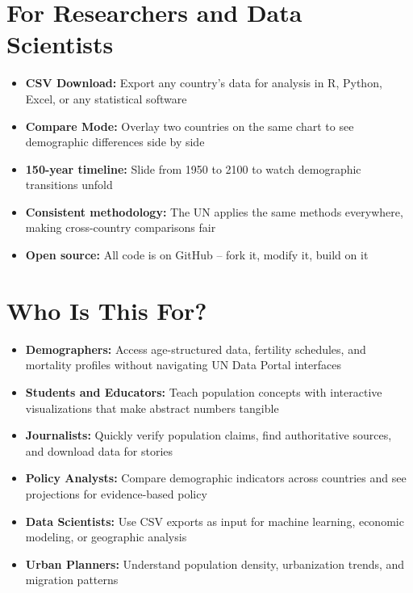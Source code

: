 \documentclass[12pt,a4paper]{article}
\begin{document}
\section{For Researchers and Data Scientists}

\begin{itemize}[leftmargin=2cm]
\item \textbf{CSV Download:} Export any country's data for analysis in R, Python,
Excel, or any statistical software
\item \textbf{Compare Mode:} Overlay two countries on the same chart to see
demographic differences side by side
\item \textbf{150-year timeline:} Slide from 1950 to 2100 to watch demographic
transitions unfold
\item \textbf{Consistent methodology:} The UN applies the same methods everywhere,
making cross-country comparisons fair
\item \textbf{Open source:} All code is on GitHub -- fork it, modify it, build on it
\end{itemize}

\section{Who Is This For?}

\begin{itemize}[leftmargin=2cm]
\item \textbf{Demographers:} Access age-structured data, fertility schedules, and
mortality profiles without navigating UN Data Portal interfaces
\item \textbf{Students and Educators:} Teach population concepts with interactive
visualizations that make abstract numbers tangible
\item \textbf{Journalists:} Quickly verify population claims, find authoritative
sources, and download data for stories
\item \textbf{Policy Analysts:} Compare demographic indicators across countries and
see projections for evidence-based policy
\item \textbf{Data Scientists:} Use CSV exports as input for machine learning,
economic modeling, or geographic analysis
\item \textbf{Urban Planners:} Understand population density, urbanization trends,
and migration patterns
\end{itemize}

\vspace{0.5cm}
\end{document}
